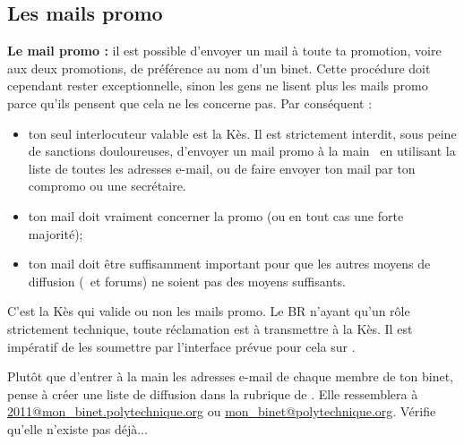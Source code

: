 \subsection{Les mails promo}


\textbf{Le mail promo :} il est possible d'envoyer un mail \`a toute
ta promotion, voire aux deux promotions, de pr\'ef\'erence au nom d'un binet.
Cette proc\'edure doit cependant rester exceptionnelle, sinon les gens ne lisent plus les
mails promo parce qu'ils pensent que cela ne les concerne pas. Par
cons\'equent :
\begin{itemize}
  \item ton seul interlocuteur valable est la K\`es. Il est strictement interdit, sous peine de sanctions douloureuses, d'envoyer un mail promo \og \`a la main \fg~en utilisant la liste de toutes les adresses e-mail,
  ou de faire envoyer ton mail par ton compromo ou une secr\'etaire.
  \item ton mail doit vraiment concerner la promo (ou en tout cas une forte majorit\'e);
  \item ton mail doit \^etre suffisamment important pour que les autres moyens de diffusion (\fkz\ et forums) ne soient pas des moyens suffisants.
\end{itemize}
C'est la K\`es qui valide ou non les mails promo. Le BR n'ayant qu'un r\^ole strictement technique, toute r\'eclamation est \`a transmettre \`a la K\`es. Il est
imp\'eratif de les soumettre par l'interface pr\'evue pour cela sur \fkz.

Plut\^ot que d'entrer \`a la main les adresses e-mail de chaque membre de ton binet, pense \`a cr\'eer une liste de diffusion dans la rubrique  de .
Elle ressemblera \`a \url{2011@mon_binet.polytechnique.org} ou \url{mon_binet@polytechnique.org}. V\'erifie qu'elle n'existe pas d\'ej\`a...
